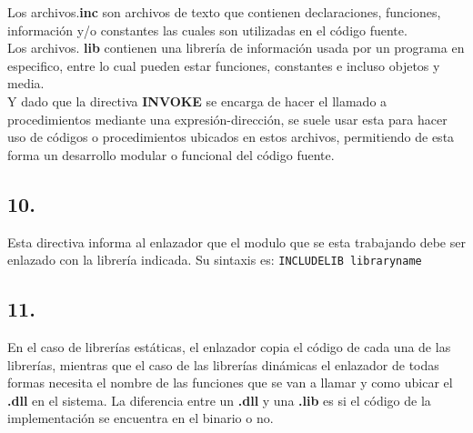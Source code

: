 Los archivos.\textbf{inc} son archivos de texto que contienen declaraciones,
funciones, información y/o constantes las cuales son utilizadas en el código
fuente.\\
Los archivos. \textbf{lib} contienen una librería de información usada por un
programa en especifico, entre lo cual pueden estar funciones, constantes e
incluso objetos y media.\\
Y dado que la directiva \textbf{INVOKE} se encarga de hacer el llamado a
procedimientos mediante una expresión-dirección, se suele usar esta para hacer
uso de códigos o procedimientos ubicados en estos archivos, permitiendo de esta
forma un desarrollo modular o funcional del código fuente.



\subsection*{10.}

Esta directiva informa al enlazador que el modulo que se esta trabajando debe
ser enlazado con la librería indicada. Su sintaxis es:
\verb|INCLUDELIB libraryname|

\subsection*{11.}

En el caso de librerías estáticas, el enlazador copia el código de cada una
de las librerías, mientras que el caso de las librerías dinámicas el enlazador
de todas formas necesita el nombre de las funciones que se van a llamar y
como ubicar el \textbf{.dll} en el sistema. La diferencia entre un \textbf{.dll}
y una \textbf{.lib} es si el código de la implementación se encuentra en el
binario o no.

